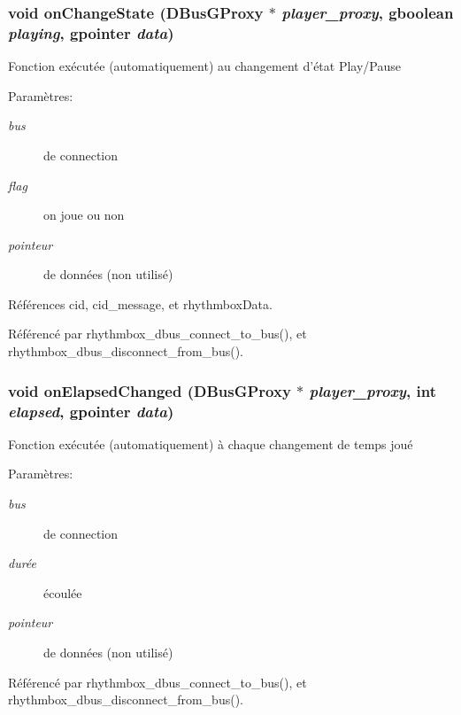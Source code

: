 \subsubsection{\setlength{\rightskip}{0pt plus 5cm}void onChangeState (DBusGProxy $\ast$ {\em player\_\-proxy}, \/  gboolean {\em playing}, \/  gpointer {\em data})}\label{cid-rhythmbox_8c_c26ce766fb1fb37b81ea2787cead1475}


Fonction exécutée (automatiquement) au changement d'état Play/Pause \begin{Desc}
\item[Paramètres:]
\begin{description}
\item[{\em bus}]de connection \item[{\em flag}]on joue ou non \item[{\em pointeur}]de données (non utilisé) \end{description}
\end{Desc}


Références cid, cid\_\-message, et rhythmboxData.

Référencé par rhythmbox\_\-dbus\_\-connect\_\-to\_\-bus(), et rhythmbox\_\-dbus\_\-disconnect\_\-from\_\-bus().
\subsubsection{\setlength{\rightskip}{0pt plus 5cm}void onElapsedChanged (DBusGProxy $\ast$ {\em player\_\-proxy}, \/  int {\em elapsed}, \/  gpointer {\em data})}\label{cid-rhythmbox_8c_a7d662176f9bcfad02d1f3f7369cf3de}


Fonction exécutée (automatiquement) à chaque changement de temps joué \begin{Desc}
\item[Paramètres:]
\begin{description}
\item[{\em bus}]de connection \item[{\em durée}]écoulée \item[{\em pointeur}]de données (non utilisé) \end{description}
\end{Desc}


Référencé par rhythmbox\_\-dbus\_\-connect\_\-to\_\-bus(), et rhythmbox\_\-dbus\_\-disconnect\_\-from\_\-bus().
